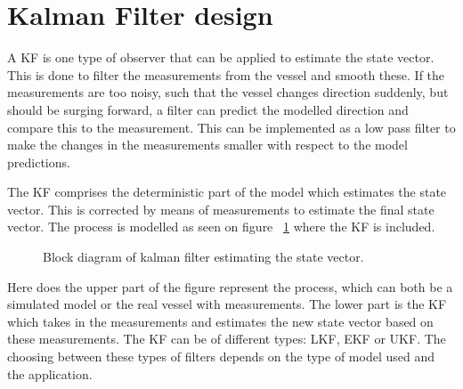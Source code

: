 \section{Kalman Filter design}
\label{sec:kfdesign}

A \ac{KF} is one type of observer that can be applied to estimate the state vector. This is done to filter the measurements from the vessel and smooth these. If the measurements are too noisy, such that the vessel changes direction suddenly, but should be surging forward, a filter can predict the modelled direction and compare this to the measurement. This can be implemented as a low pass filter to make the changes in the measurements smaller with respect to the model predictions.

The \ac{KF} comprises the deterministic part of the model which estimates the state vector. This is corrected by means of measurements to estimate the final state vector. The process is modelled as seen on figure ~\ref{fig:blockkf} where the \ac{KF} is included.

\begin{figure}
	\centering
	
	\caption{Block diagram of kalman filter estimating the state vector.}
	\label{fig:blockkf}
\end{figure}

Here does the upper part of the figure represent the process, which can both be a simulated model or the real vessel with measurements. The lower part is the \ac{KF} which takes in the measurements and estimates the new state vector based on these measurements. The \ac{KF} can be of different types: \ac{LKF}, \ac{EKF} or \ac{UKF}. The choosing between these types of filters depends on the type of model used and the application. 

